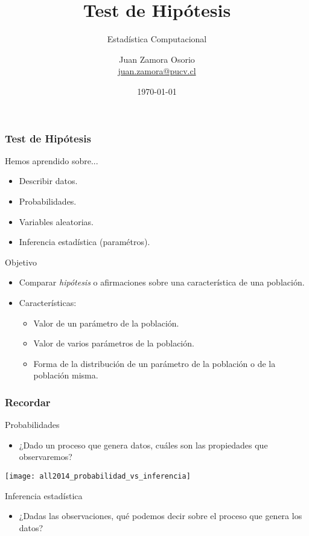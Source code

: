 \documentclass[table]{beamer}
\title{Test de Hipótesis}
\subtitle{Estadística Computacional}
\author[J.Z.O-2023]{Juan Zamora Osorio\\\url{juan.zamora@pucv.cl}}
\institute[PUCV]{Instituto de Estadística\\Pontificia Universidad Cat\'olica de Valpara\'iso}
\date{\today}
\begin{document}

\begin{frame}[plain]
    \titlepage
\end{frame}

\begin{frame}
    \frametitle{Test de Hipótesis}
    \begin{block}{Hemos aprendido sobre...}
        \begin{itemize}
            \item Describir datos.
            \item Probabilidades.
            \item Variables aleatorias.
            \item Inferencia estadística (paramétros).
        \end{itemize}
    \end{block}
    \begin{block}{Objetivo}
        \begin{itemize}
            \item Comparar \emph{hipótesis} o afirmaciones sobre una característica de una población.
            \item Características:
                \begin{itemize}
                    \item Valor de un parámetro de la población.
                    \item Valor de varios parámetros de la población.
                    \item Forma de la distribución de un parámetro de la población o de la población misma.
                \end{itemize}
        \end{itemize}
    \end{block}
\end{frame}

\begin{frame}
    \frametitle{Recordar}
    \begin{block}{Probabilidades}
        \begin{itemize}
            \item ¿Dado un proceso que genera datos, cuáles son las propiedades que observaremos?
        \end{itemize}
    \end{block}
    \begin{center}
        \texttt{[image: all2014\_probabilidad\_vs\_inferencia]}
    \end{center}
    \begin{block}{Inferencia estadística}
        \begin{itemize}
            \item ¿Dadas las observaciones, qué podemos decir sobre el proceso que genera los datos?
        \end{itemize}
    \end{block}
\end{frame}
\end{document}

